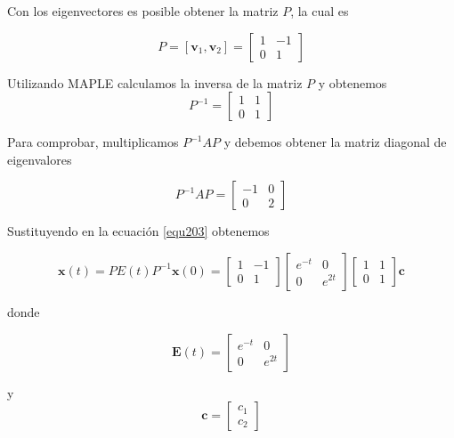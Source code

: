 \documentclass[12pt]{book}
\theoremstyle{definition}
\theoremstyle{remark}
\theoremstyle{plain}
\begin{document}
Con los eigenvectores es posible obtener la matriz $P$, la cual es

\begin{equation*}
P = [ \mathbf{v}_1, \mathbf{v}_2 ] =  \begin{bmatrix}
1 & -1\\
0 & 1
\end{bmatrix}
\end{equation*}

Utilizando MAPLE calculamos la inversa de la matriz $P$ y obtenemos
\begin{equation*}
P^{-1}  =  \begin{bmatrix}
1 & 1\\
0 & 1
\end{bmatrix}
\end{equation*}

Para comprobar, multiplicamos $P^{-1}AP$ y debemos obtener la matriz diagonal de eigenvalores

\begin{equation*}
P^{-1}AP  =  \begin{bmatrix}
-1 & 0\\
0 & 2
\end{bmatrix}
\end{equation*}

Sustituyendo en la ecuación \ref{equ203} obtenemos

\begin{equation*}
\mathbf{x}(t) = P E(t) P^{-1} \mathbf{x}(0) = \begin{bmatrix}
1 & -1\\
0 & 1
\end{bmatrix}
\begin{bmatrix}
e^{-t} & 0\\
0 & e^{2t}
\end{bmatrix}
\begin{bmatrix}
1 & 1\\
0 & 1
\end{bmatrix}
\mathbf{c}
\end{equation*}

donde 

\begin{equation*}
\mathbf{E}(t) = \begin{bmatrix}
e^{-t} & 0\\
0 & e^{2t}
\end{bmatrix}
\end{equation*}

y 
\begin{equation*}
\mathbf{c} = \begin{bmatrix}
c_1\\
c_2
\end{bmatrix}
\end{equation*}
\end{document}

